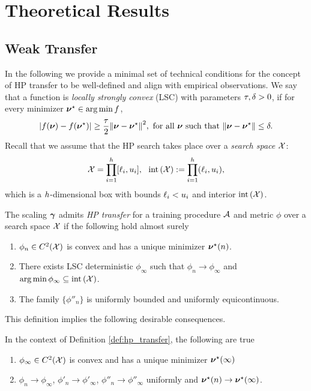 \newpage

\section{Theoretical Results}
\subsection{Weak Transfer}\label{app:weak_transfer}
In the following we provide a minimal set of technical conditions for the concept of HP transfer to be well-defined and align with empirical observations. We say that a function is \textit{locally strongly convex} (LSC) with parameters $\tau, \delta > 0$, if for every minimizer $\bm{\nu}^\star \in \operatorname*{arg\,min} f$,
\[
    |f(\bm{\nu}) - f(\bm{\nu}^\star)| \geq \frac{\tau}{2} \norm{\bm{\nu} - \bm{\nu}^\star}^{2},~ \text{for all } \bm{\nu} \text{ such that } \norm{\bm{\nu} - \bm{\nu}^\star} \leq \delta.
\]
Recall that we assume that the HP search takes place over a \emph{search space} $\mathcal{X}$:
\[
   \mathcal{X} = \prod\limits_{i=1}^{h} [\ell_i, u_i],~~\operatorname{int}\left(\mathcal{X}\right) := \prod\limits_{i=1}^{h} (\ell_i, u_i),
\]
which is a $h$-dimensional box with bounds $\ell_i < u_i$ and interior $\operatorname{int}\left(\mathcal{X}\right)$. 
\begin{definition}[HP Transfer]\label{def:hp_transfer}
    The scaling $\bm{\gamma}$ admits \textit{HP transfer} for a training procedure $\mathcal{A}$ and metric $\phi$ over a search space $\mathcal{X}$ if the following hold almost surely
    \begin{enumerate} 
        \item $\phi_n \in C^2(\mathcal{X})$ is convex and has a unique minimizer $\bm{\nu}^\star(n)$.

        \item There exists LSC deterministic $\phi_\infty$ such that $\phi_n \to \phi_{\infty}$ and $\operatorname*{arg\,min} \phi_\infty \subseteq \operatorname{int}\left(\mathcal{X}\right)$.

        \item The family $\{\phi''_n\}$ is uniformly bounded and uniformly equicontinuous.
    \end{enumerate}    
\end{definition}
This definition implies the following desirable consequences. 
\begin{proposition}\label{prop:hp_transfer_properties}
    In the context of Definition \ref{def:hp_transfer}, the following are true
    \begin{enumerate}
        \item $\phi_\infty \in C^2(\mathcal{X})$ is convex and has a unique minimizer $\bm{\nu}^\star(\infty)$
        
        \item $\phi_n \to \phi_\infty$, $\phi'_n \to \phi'_\infty$, $\phi''_n \to \phi''_\infty$ uniformly and $\bm{\nu}^\star(n) \to \bm{\nu}^\star(\infty)$.
    \end{enumerate}
\end{proposition}
